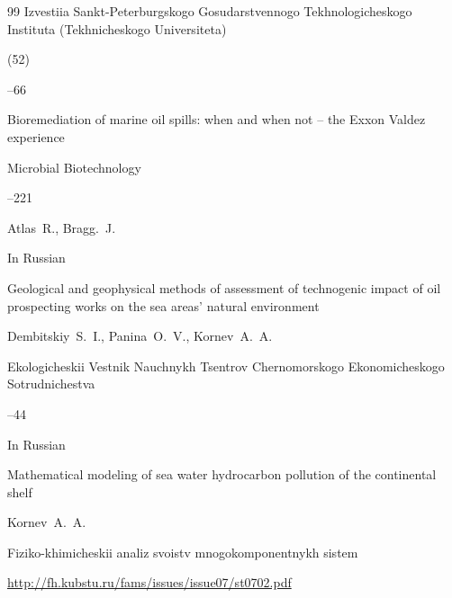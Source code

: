 \begin{thebibliography}{99}
\jour Izvestiia Sankt-Peterburgskogo Gosudarstvennogo Tekhnologicheskogo Instituta (Tekhnicheskogo Universiteta)


 (52)

--66






\paper Bioremediation of marine oil spills: when and when not -- the Exxon Valdez experience


\jour Microbial Biotechnology 



--221

\by Atlas~R., Bragg.~J.







\lang In Russian

\paper Geological and geophysical methods of assessment of technogenic impact of oil prospecting works on the sea areas' natural environment

\by Dembitskiy~S.~I., Panina~O.~V., Kornev~A.~A.

\jour Ekologicheskii Vestnik Nauchnykh Tsentrov Chernomorskogo Ekonomicheskogo Sotrudnichestva



--44




\lang In Russian

\paper Mathematical modeling of sea water hydrocarbon pollution of the continental shelf

\by Kornev~A.~A.

\jour Fiziko-khimicheskii analiz svoistv mnogokomponentnykh sistem



\issueinfo \url{http://fh.kubstu.ru/fams/issues/issue07/st0702.pdf}







\end{thebibliography}
